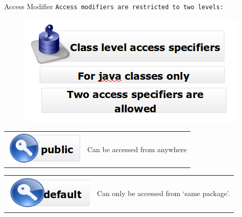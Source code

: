 \documentclass[14pt]{beamer}
\begin{document}
\begin{frame}{Access Modifier}
 \texttt{Access modifiers are restricted to two levels:}
 \begin{figure}[H]
 \begin{center}
   \includegraphics[scale=.3]{class-level-description.png}   
 \end{center}
  \end{figure}
  
  \begin{tabular}{l l}
\begin{minipage}{0.15\textwidth}
\includegraphics[scale=.4]{public.png}
\end{minipage}
&
\begin{minipage}{0.85\textwidth}
Can be accessed from anywhere
\end{minipage}
\end{tabular} 

\begin{tabular}{l l}
\begin{minipage}{0.25\textwidth}
\includegraphics[scale=.5]{default.png}
\end{minipage}
&
\begin{minipage}{0.75\textwidth}
Can only be accessed from `same package'.
\end{minipage}
\end{tabular} 
\end{frame}
\end{document}

